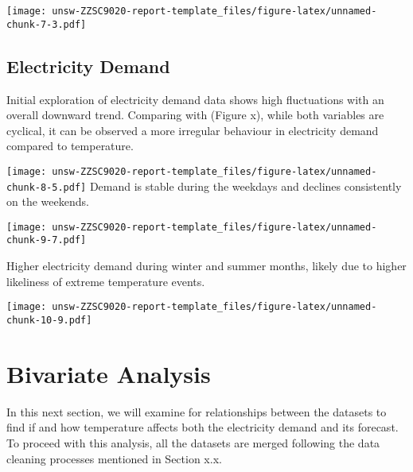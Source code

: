\documentclass[mstat,12pt,a4paper]{unswthesis}
\begin{document}
\texttt{[image: unsw-ZZSC9020-report-template\_files/figure-latex/unnamed-chunk-7-3.pdf]}

\subsection{Electricity Demand}\label{electricity-demand}

Initial exploration of electricity demand data shows high fluctuations
with an overall downward trend. Comparing with (Figure x), while both
variables are cyclical, it can be observed a more irregular behaviour in
electricity demand compared to temperature.

\texttt{[image: unsw-ZZSC9020-report-template\_files/figure-latex/unnamed-chunk-8-5.pdf]}
\noindent Demand is stable during the weekdays and declines consistently
on the weekends.

\texttt{[image: unsw-ZZSC9020-report-template\_files/figure-latex/unnamed-chunk-9-7.pdf]}
\bigskip

\noindent Higher electricity demand during winter and summer months,
likely due to higher likeliness of extreme temperature events.

\texttt{[image: unsw-ZZSC9020-report-template\_files/figure-latex/unnamed-chunk-10-9.pdf]}

\section{Bivariate Analysis}\label{bivariate-analysis}

In this next section, we will examine for relationships between the
datasets to find if and how temperature affects both the electricity
demand and its forecast. To proceed with this analysis, all the datasets
are merged following the data cleaning processes mentioned in Section
x.x.
\end{document}
